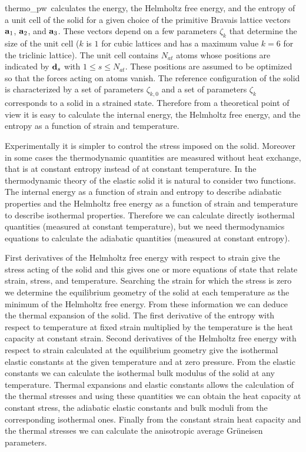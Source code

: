 \documentclass[12pt,a4paper]{article}
\def\tpw{{\sc thermo\_pw}}
\begin{document}
\tpw\ calculates the energy, the Helmholtz free energy, and the
entropy of a unit cell of the solid for a given choice of the primitive 
Bravais lattice vectors ${\bf a}_1$, ${\bf a}_2$, and ${\bf a}_3$. These
vectors depend on a few parameters $\zeta_k$ that determine the size 
of the unit cell ($k$ is $1$ for cubic lattices and has a maximum
value $k=6$ for the triclinic lattice).
The unit cell contains $N_{at}$ atoms
whose positions are indicated by ${\bf d}_s$ with $1\le s\le N_{at}$.
These positions are assumed to be optimized so that the forces acting
on atoms vanish.
The reference configuration of the solid is
characterized by a set of parameters $\zeta_{k,0}$ and a set of parameters 
$\zeta_k$ corresponds to a solid in a strained state.
Therefore from a theoretical point of view it is easy to calculate the 
internal energy, the Helmholtz free energy, and the entropy as a 
function of strain and temperature.

Experimentally it is simpler to control the stress imposed on the solid. 
Moreover in some cases the thermodynamic quantities are measured without 
heat exchange, that is at constant entropy instead of at constant temperature. 
In the thermodynamic theory of the elastic solid it is natural to consider two
functions. The internal energy as a function of strain and entropy  
to describe adiabatic properties and the Helmholtz free energy as a function
of strain and temperature to describe isothermal properties.
Therefore we can calculate directly isothermal quantities (measured at constant
temperature), but we need thermodynamics equations to calculate
the adiabatic quantities (measured at constant entropy).

First derivatives of the Helmholtz free energy with respect to strain
give the stress acting of the solid and this gives one or more equations
of state that relate strain, stress, and temperature. 
Searching the strain for which the stress is zero we determine the 
equilibrium geometry of the solid at each temperature as the minimum of 
the Helmholtz free energy. From these information we can deduce the
thermal expansion of the solid. The first derivative of the entropy 
with respect to temperature at fixed strain multiplied by the temperature
is the heat capacity at constant strain. Second derivatives of the 
Helmholtz free energy with 
respect to strain calculated at the equilibrium geometry give the 
isothermal elastic constants at the given temperature and at zero pressure. 
From the elastic constants we can calculate the isothermal bulk modulus 
of the solid at any temperature. 
Thermal expansions and elastic constants allows the calculation of the thermal
stresses and using these quantities we can obtain the heat capacity at
constant stress, the adiabatic elastic constants and bulk moduli 
from the corresponding isothermal ones. Finally from the constant strain 
heat capacity and the thermal stresses we can calculate the anisotropic 
average Gr\"uneisen parameters.
\end{document}
